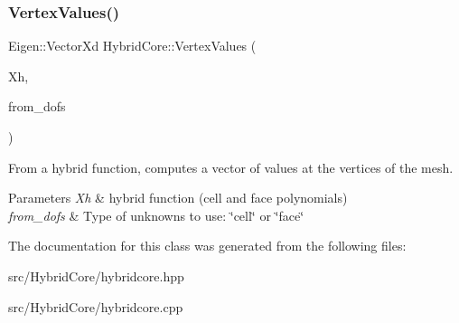 \subsubsection{\texorpdfstring{Vertex\+Values()}{VertexValues()}}
{\footnotesize\ttfamily Eigen\+::\+Vector\+Xd Hybrid\+Core\+::\+Vertex\+Values (\begin{DoxyParamCaption}\item[{const Eigen\+::\+Vector\+Xd}]{Xh,  }\item[{const std\+::string}]{from\+\_\+dofs }\end{DoxyParamCaption})}



From a hybrid function, computes a vector of values at the vertices of the mesh. 


\begin{DoxyParams}{Parameters}
{\em Xh} & hybrid function (cell and face polynomials) \\
\hline
{\em from\+\_\+dofs} & Type of unknowns to use\+: \char`\"{}cell\char`\"{} or \char`\"{}face\char`\"{} \\
\hline
\end{DoxyParams}


The documentation for this class was generated from the following files\+:\begin{DoxyCompactItemize}
\item 
src/\+Hybrid\+Core/hybridcore.\+hpp\item 
src/\+Hybrid\+Core/hybridcore.\+cpp\end{DoxyCompactItemize}
